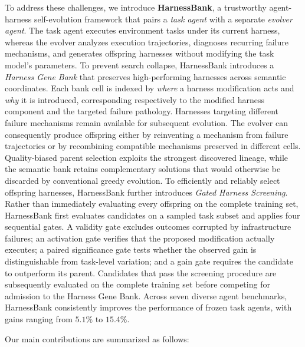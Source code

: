 To address these challenges, we introduce \textbf{HarnessBank}, a trustworthy agent-harness self-evolution framework that pairs a \emph{task agent} with a separate \emph{evolver agent}.
%
The task agent executes environment tasks under its current harness, whereas the evolver analyzes execution trajectories, diagnoses recurring failure mechanisms, and generates offspring harnesses without modifying the task model's parameters.
%
To prevent search collapse, HarnessBank introduces a \emph{Harness Gene Bank} that preserves high-performing harnesses across semantic coordinates.
%
Each bank cell is indexed by \emph{where} a harness modification acts and \emph{why} it is introduced, corresponding respectively to the modified harness component and the targeted failure pathology.
%
Harnesses targeting different failure mechanisms remain available for subsequent evolution.
%
The evolver can consequently produce offspring either by reinventing a mechanism from failure trajectories or by recombining compatible mechanisms preserved in different cells.
%
Quality-biased parent selection exploits the strongest discovered lineage, while the semantic bank retains complementary solutions that would otherwise be discarded by conventional greedy evolution.
%
To efficiently and reliably select offspring harnesses, HarnessBank further introduces \emph{Gated Harness Screening}.
%
Rather than immediately evaluating every offspring on the complete training set, HarnessBank first evaluates candidates on a sampled task subset and applies four sequential gates.
%
A validity gate excludes outcomes corrupted by infrastructure failures; an activation gate verifies that the proposed modification actually executes; a paired significance gate tests whether the observed gain is distinguishable from task-level variation; and a gain gate requires the candidate to outperform its parent.
%
Candidates that pass the screening procedure are subsequently evaluated on the complete training set before competing for admission to the Harness Gene Bank.
%
Across seven diverse agent benchmarks, HarnessBank consistently improves the performance of frozen task agents, with gains ranging from $5.1\%$ to $15.4\%$.


Our main contributions are summarized as follows:

